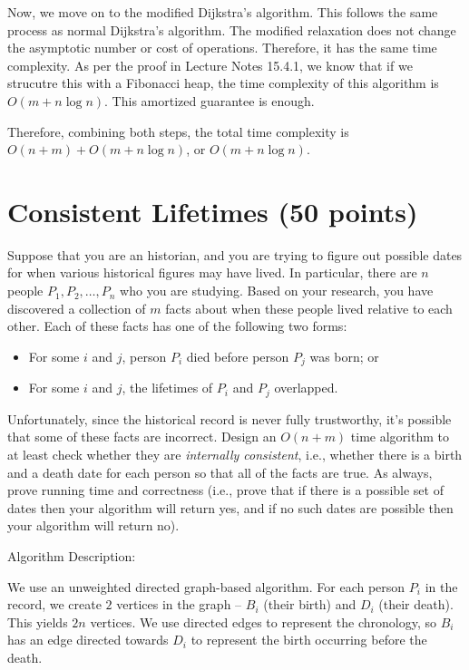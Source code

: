 \documentclass[11pt]{article}
\begin{document}
Now, we move on to the modified Dijkstra's algorithm. This follows the same process as normal Dijkstra's algorithm. 
The modified relaxation does not change the asymptotic number or cost of operations. Therefore, it has the same time complexity. 
As per the proof in Lecture Notes 15.4.1, we know that if we strucutre this with a 
Fibonacci heap, the time complexity of this algorithm is $O(m + n \log n)$. This amortized guarantee is enough. 

Therefore, combining both steps, the total time complexity is $O(n + m) + O(m + n \log n)$, or $O(m + n \log n)$. 

\section{Consistent Lifetimes (50 points)}

Suppose that you are an historian, and you are trying to figure out possible dates for when various historical figures may have lived. 
In particular, there are $n$ people $P_1, P_2, \dots, P_n$ who you are studying. Based on your research, 
you have discovered a collection of $m$ facts about when these people lived relative to each other. 
Each of these facts has one of the following two forms:

\begin{itemize}
\item For some $i$ and $j$, person $P_i$ died before person $P_j$ was born; or
\item For some $i$ and $j$, the lifetimes of $P_i$ and $P_j$ overlapped. 
\end{itemize}

Unfortunately, since the historical record is never fully trustworthy, it's possible that some of these facts are incorrect. 
Design an $O(n+m)$ time algorithm to at least check whether they are \emph{internally consistent}, i.e., 
whether there is a birth and a death date for each person so that all of the facts are true. 
As always, prove running time and correctness (i.e., prove that if there is a possible set of dates then your algorithm will return yes, 
and if no such dates are possible then your algorithm will return no).

\bigbreak

Algorithm Description:

We use an unweighted directed graph-based algorithm. For each person $P_i$ in the record, we create $2$ vertices in the graph -- 
$B_i$ (their birth) and $D_i$ (their death). This yields $2n$ vertices. We use directed edges to represent the chronology, 
so $B_i$ has an edge directed towards $D_i$ to represent the birth occurring before the death. 
\end{document}
